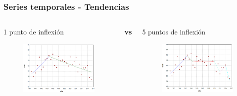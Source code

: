 \documentclass{beamer}
\begin{document}
\begin{frame}\frametitle{Series temporales - Tendencias}
	\begin{columns}
		\begin{column}{0.5\textwidth}
			\centering \normalsize 1 punto de inflexión
			\begin{figure}
				\includegraphics[width=\textwidth]{images/jpo1.png}
			\end{figure}
			
		\end{column}
		\large{\textbf{vs}}
		\begin{column}{0.5\textwidth}
			\centering \normalsize 5 puntos de inflexión
			\begin{figure}
				\centering
				\includegraphics[width=\textwidth]{images/jpo5.png}
			\end{figure}
		\end{column}
	\end{columns}


\end{frame}
\end{document}
